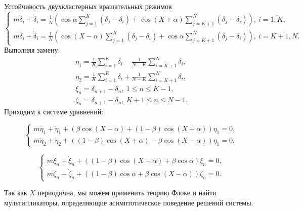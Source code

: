 \begin{chapter}{Устойчивость двухкластерных вращательных режимов}
	\begin{equation}
		\begin{cases}
			m\ddot{\delta}_i + \dot{\delta}_i = \frac{1}{N} \left( \cos{\alpha} \sum_{j = 1}^K (\delta_j - \delta_i) + \cos{(X + \alpha)} \sum_{j = K + 1}^N (\delta_j - \delta_i) \right), \ i = \overline{1,K}, \\
			m\ddot{\delta}_i + \dot{\delta}_i = \frac{1}{N} \left( \cos{(X - \alpha)} \sum_{j = 1}^K (\delta_j - \delta_i) +  \cos{\alpha} \sum_{j = K + 1}^N (\delta_j - \delta_i)  \right), \ i = \overline{K + 1,N}.
		\end{cases}		
	\end{equation}
	Выполняя замену:
	\begin{align*}
		\eta_1 = \frac{1}{K} \sum_{i = 1}^K \delta_i - \frac{1}{N - K} \sum_{i = K + 1}^N \delta_i, \\
		\eta_2 = \frac{1}{K} \sum_{i = 1}^K \delta_i + \frac{1}{N - K} \sum_{i = K + 1}^N \delta_i, \\
		\xi_n = \delta_{n+1} - \delta_n, \ 1 \leq  n \leq K - 1, \\
		\zeta_n = \delta_{n+1} - \delta_n, \ K + 1 \leq n \leq N - 1.
	\end{align*}
	Приходим к системе уравнений:
	
	\begin{equation} \label{split-linear-pert-sys-n12}
		\begin{cases}
			m\ddot{\eta}_1 + \dot{\eta}_1 + \left( \beta \cos{(X - \alpha)} + (1 - \beta) \cos{(X + \alpha)} \right) \eta_1 = 0, \\
			m\ddot{\eta}_2 + \dot{\eta}_2 + \left( (1 - \beta) \cos{(X + \alpha)} - \beta \cos{(X - \alpha)} \right) \eta_1 = 0,
		\end{cases}
	\end{equation}
	
	
	\begin{equation} \label{split-linear-pert-sys-ksi-eta}
		\begin{cases}
			m\ddot{\xi}_n + \dot{\xi}_n + \left( (1 - \beta) \cos{(X + \alpha)} + \beta \cos{\alpha} \right) \xi_n = 0, \\
			m\ddot{\zeta}_n + \dot{\zeta}_n + \left( (1 - \beta) \cos{\alpha} + \beta \cos{(X - \alpha)} \right) \zeta_n = 0.
		\end{cases}
	\end{equation}
	
	Так как $X$ периодична, мы можем применить теорию Флоке
	и найти мультипликаторы, определяющие асимптотическое поведение решений системы.
	

\end{chapter}
